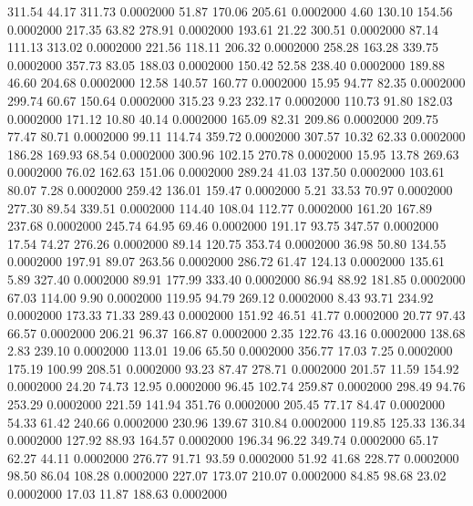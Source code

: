  311.54   44.17  311.73   0.0002000
  51.87  170.06  205.61   0.0002000
   4.60  130.10  154.56   0.0002000
 217.35   63.82  278.91   0.0002000
 193.61   21.22  300.51   0.0002000
  87.14  111.13  313.02   0.0002000
 221.56  118.11  206.32   0.0002000
 258.28  163.28  339.75   0.0002000
 357.73   83.05  188.03   0.0002000
 150.42   52.58  238.40   0.0002000
 189.88   46.60  204.68   0.0002000
  12.58  140.57  160.77   0.0002000
  15.95   94.77   82.35   0.0002000
 299.74   60.67  150.64   0.0002000
 315.23    9.23  232.17   0.0002000
 110.73   91.80  182.03   0.0002000
 171.12   10.80   40.14   0.0002000
 165.09   82.31  209.86   0.0002000
 209.75   77.47   80.71   0.0002000
  99.11  114.74  359.72   0.0002000
 307.57   10.32   62.33   0.0002000
 186.28  169.93   68.54   0.0002000
 300.96  102.15  270.78   0.0002000
  15.95   13.78  269.63   0.0002000
  76.02  162.63  151.06   0.0002000
 289.24   41.03  137.50   0.0002000
 103.61   80.07    7.28   0.0002000
 259.42  136.01  159.47   0.0002000
   5.21   33.53   70.97   0.0002000
 277.30   89.54  339.51   0.0002000
 114.40  108.04  112.77   0.0002000
 161.20  167.89  237.68   0.0002000
 245.74   64.95   69.46   0.0002000
 191.17   93.75  347.57   0.0002000
  17.54   74.27  276.26   0.0002000
  89.14  120.75  353.74   0.0002000
  36.98   50.80  134.55   0.0002000
 197.91   89.07  263.56   0.0002000
 286.72   61.47  124.13   0.0002000
 135.61    5.89  327.40   0.0002000
  89.91  177.99  333.40   0.0002000
  86.94   88.92  181.85   0.0002000
  67.03  114.00    9.90   0.0002000
 119.95   94.79  269.12   0.0002000
   8.43   93.71  234.92   0.0002000
 173.33   71.33  289.43   0.0002000
 151.92   46.51   41.77   0.0002000
  20.77   97.43   66.57   0.0002000
 206.21   96.37  166.87   0.0002000
   2.35  122.76   43.16   0.0002000
 138.68    2.83  239.10   0.0002000
 113.01   19.06   65.50   0.0002000
 356.77   17.03    7.25   0.0002000
 175.19  100.99  208.51   0.0002000
  93.23   87.47  278.71   0.0002000
 201.57   11.59  154.92   0.0002000
  24.20   74.73   12.95   0.0002000
  96.45  102.74  259.87   0.0002000
 298.49   94.76  253.29   0.0002000
 221.59  141.94  351.76   0.0002000
 205.45   77.17   84.47   0.0002000
  54.33   61.42  240.66   0.0002000
 230.96  139.67  310.84   0.0002000
 119.85  125.33  136.34   0.0002000
 127.92   88.93  164.57   0.0002000
 196.34   96.22  349.74   0.0002000
  65.17   62.27   44.11   0.0002000
 276.77   91.71   93.59   0.0002000
  51.92   41.68  228.77   0.0002000
  98.50   86.04  108.28   0.0002000
 227.07  173.07  210.07   0.0002000
  84.85   98.68   23.02   0.0002000
  17.03   11.87  188.63   0.0002000
